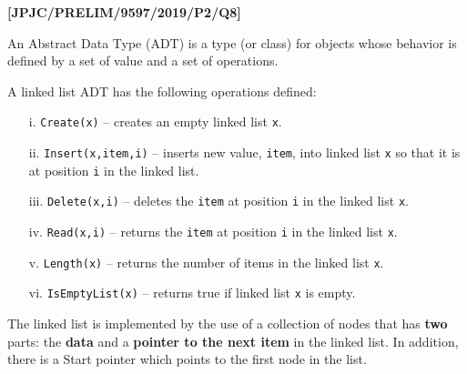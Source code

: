 \item \textbf{{[}JPJC/PRELIM/9597/2019/P2/Q8{]} }

An Abstract Data Type (ADT) is a type (or class) for objects whose
behavior is defined by a set of value and a set of operations. 

A linked list ADT has the following operations defined:
\begin{enumerate}
\item[i. ]  \texttt{Create(x)} -- creates an empty linked list \texttt{x}.
\item[ii.]  \texttt{Insert(x,item,i)} -- inserts new value, \texttt{item},
into linked list \texttt{x} so that it is at position \texttt{i} in
the linked list.
\item[iii.]  \texttt{Delete(x,i)} -- deletes the \texttt{item} at position \texttt{i}
in the linked list \texttt{x}.
\item[iv.]  \texttt{Read(x,i)} -- returns the \texttt{item} at position \texttt{i}
in the linked list \texttt{x}.
\item[v.]  \texttt{Length(x)} -- returns the number of items in the linked
list \texttt{x}.
\item[vi.]  \texttt{IsEmptyList(x)} -- returns true if linked list \texttt{x}
is empty.
\end{enumerate}
The linked list is implemented by the use of a collection of nodes
that has \textbf{two} parts: the \textbf{data} and a \textbf{pointer
to the next item} in the linked list. In addition, there is a Start
pointer which points to the first node in the list. 
